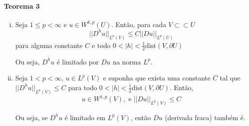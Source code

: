 \documentclass[a4paper, 11pt]{book}
\newcommand{\pu}{\partial U}
\begin{document}
\paragraph{Teorema 3}\label{t:sobolev-quociente-de-diferenças}
\begin{enumerate}[(i)]
	\item Seja $1\leq p < \infty$ e $u \in W^{k,p}(U)$. Então, para cada $V \subset\subset U$ \[ ||D^hu||_{L^p(V)} \leq C ||Du||_{L^p(U)} \] para alguma constante $C$ e todo $0 < |h| < \frac{1}{2}\text{dist}(V, \pu)$
	
	Ou seja, $D^h u$ é limitado por $Du$ na norma $L^p$.

	\item Seja $1 < p < \infty$, $u \in L^p(V)$ e suponha que exista uma constante $C$ tal que $||D^hu||_{L^p(V)}\leq C$ para todo $0<|h|< \frac{1}{2}\text{dist}(V,\pu)$. Então, \[u \in W^{1,p}(V), \text{ e } ||Du||_{L^p(V)} \leq C\]
	
	Ou seja, se $D^h u$ é limitado em $L^p(V)$, então $Du$ (derivada fraca) também é.
\end{enumerate}
\end{document}
